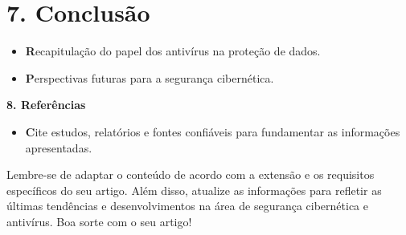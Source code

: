 \documentclass[10pt,conference,twocolumn]{article}
\begin{document}
\section* {7. Conclusão}
 \begin{itemize}
\item \textbf Recapitulação do papel dos antivírus na proteção de dados.
\item \textbf Perspectivas futuras para a segurança cibernética.
\end{itemize}

\textbf {8. Referências}
 \begin{itemize}
\item \textbf Cite estudos, relatórios e fontes confiáveis para fundamentar as informações apresentadas.
\end{itemize}

Lembre-se de adaptar o conteúdo de acordo com a extensão e os requisitos específicos do seu artigo. Além disso, atualize as informações para refletir as últimas tendências e desenvolvimentos na área de segurança cibernética e antivírus. Boa sorte com o seu artigo!
\end{document}
